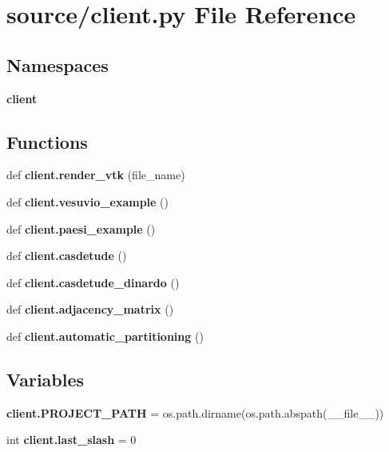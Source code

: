 \section{source/client.py File Reference}
\label{client_8py}
\subsection*{Namespaces}
\begin{DoxyCompactItemize}
\item 
 \textbf{ client}
\end{DoxyCompactItemize}
\subsection*{Functions}
\begin{DoxyCompactItemize}
\item 
def \textbf{ client.\+render\+\_\+vtk} (file\+\_\+name)
\item 
def \textbf{ client.\+vesuvio\+\_\+example} ()
\item 
def \textbf{ client.\+paesi\+\_\+example} ()
\item 
def \textbf{ client.\+casdetude} ()
\item 
def \textbf{ client.\+casdetude\+\_\+dinardo} ()
\item 
def \textbf{ client.\+adjacency\+\_\+matrix} ()
\item 
def \textbf{ client.\+automatic\+\_\+partitioning} ()
\end{DoxyCompactItemize}
\subsection*{Variables}
\begin{DoxyCompactItemize}
\item 
\textbf{ client.\+P\+R\+O\+J\+E\+C\+T\+\_\+\+P\+A\+TH} = os.\+path.\+dirname(os.\+path.\+abspath(\+\_\+\+\_\+file\+\_\+\+\_\+))
\item 
int \textbf{ client.\+last\+\_\+slash} = 0
\end{DoxyCompactItemize}
